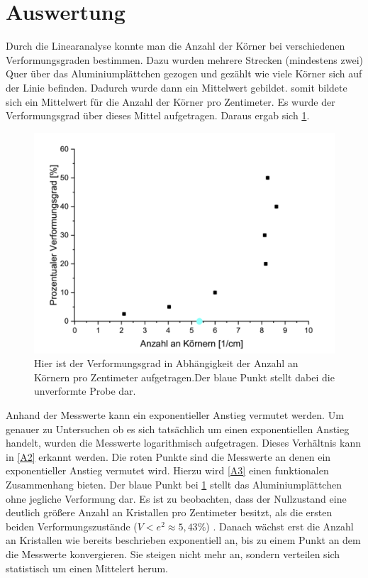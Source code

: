 \documentclass[
	a4paper,
	12pt,
	pagesize,
	ngerman
]{scrartcl}
\begin{document}
\section{Auswertung}
Durch die Linearanalyse konnte man die Anzahl der Körner bei verschiedenen Verformungsgraden bestimmen. Dazu wurden mehrere Strecken (mindestens zwei) Quer über das Aluminiumplättchen gezogen und gezählt wie viele Körner sich auf der Linie befinden. Dadurch wurde dann ein Mittelwert gebildet. somit bildete sich ein Mittelwert für die Anzahl der Körner pro Zentimeter. Es wurde der Verformungsgrad über dieses Mittel aufgetragen.
Daraus ergab sich \cref{A1}.
\begin{figure}[h!]
    \centering
    \includegraphics[scale = 0.3]{nichtln.png}
    \caption{Hier ist der Verformungsgrad in Abhängigkeit der Anzahl an Körnern pro Zentimeter aufgetragen.Der blaue Punkt stellt dabei die unverformte Probe dar.}
    \label{A1}
\end{figure}

Anhand der Messwerte kann ein exponentieller Anstieg vermutet werden. Um genauer zu Untersuchen ob es sich tatsächlich um einen exponentiellen Anstieg handelt, wurden die Messwerte logarithmisch aufgetragen. Dieses Verhältnis kann in \cref{A2} erkannt werden. Die roten Punkte sind die Messwerte an denen ein exponentieller Anstieg vermutet wird. Hierzu wird \cref{A3} einen funktionalen Zusammenhang bieten. Der blaue Punkt bei \cref{A1} stellt das Aluminiumplättchen ohne jegliche Verformung dar. Es ist zu beobachten, dass der Nullzustand eine deutlich größere Anzahl an Kristallen pro Zentimeter besitzt, als die ersten beiden Verformungszustände ($V<e^2 \approx 5,43\%$) . Danach wächst erst die Anzahl an Kristallen wie bereits beschrieben exponentiell an, bis zu einem Punkt an dem die Messwerte konvergieren. Sie steigen nicht mehr an, sondern verteilen sich statistisch um einen Mittelert herum.
\end{document}

